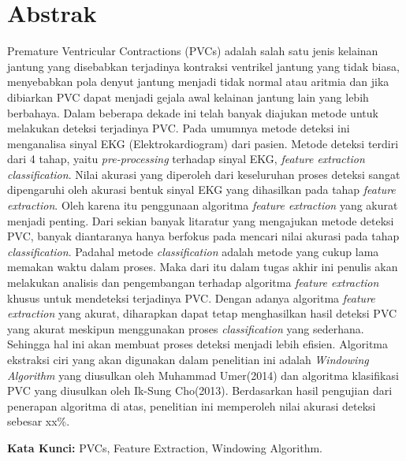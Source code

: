 \chapter*{Abstrak}
Premature Ventricular Contractions (PVCs) adalah salah satu jenis kelainan jantung yang disebabkan terjadinya kontraksi ventrikel jantung yang tidak biasa, menyebabkan pola denyut jantung menjadi tidak normal atau aritmia dan jika dibiarkan PVC dapat menjadi gejala awal kelainan jantung lain yang lebih berbahaya. Dalam beberapa dekade ini telah banyak diajukan metode untuk melakukan deteksi terjadinya PVC. Pada umumnya metode deteksi ini menganalisa sinyal EKG (Elektrokardiogram) dari pasien. Metode deteksi terdiri dari 4 tahap, yaitu \textit{pre-processing} terhadap sinyal EKG, \textit{feature extraction} \textit{classification}. 
Nilai akurasi yang diperoleh dari keseluruhan proses deteksi sangat dipengaruhi oleh akurasi bentuk sinyal EKG yang dihasilkan pada tahap \textit{feature extraction}. Oleh karena itu penggunaan algoritma \textit{feature extraction} yang akurat menjadi penting. Dari sekian banyak litaratur yang mengajukan metode deteksi PVC, banyak diantaranya hanya berfokus pada mencari nilai akurasi pada tahap \textit{classification}. Padahal metode \textit{classification} adalah metode yang cukup lama memakan waktu dalam proses. 
Maka dari itu dalam tugas akhir ini penulis akan melakukan analisis dan pengembangan terhadap algoritma \textit{feature extraction} khusus untuk mendeteksi terjadinya PVC. Dengan adanya algoritma \textit{feature extraction} yang akurat, diharapkan dapat tetap menghasilkan hasil deteksi PVC yang akurat meskipun menggunakan proses \textit{classification} yang sederhana. Sehingga hal ini akan membuat proses deteksi menjadi lebih efisien. 
Algoritma ekstraksi ciri yang akan digunakan dalam penelitian ini adalah \textit{Windowing Algorithm} yang diusulkan oleh Muhammad Umer(2014) dan algoritma klasifikasi PVC yang diusulkan oleh Ik-Sung Cho(2013). Berdasarkan hasil pengujian dari penerapan algoritma di atas, penelitian ini memperoleh nilai akurasi deteksi sebesar xx\%.
  
\vspace{0.5 cm}
\begin{flushleft}
{\textbf{Kata Kunci:} PVCs, Feature Extraction, Windowing Algorithm.}
\end{flushleft}